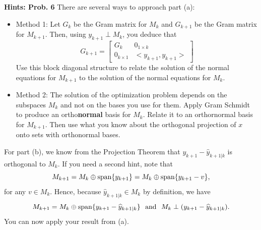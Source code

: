 \documentclass[letterpaper]{article}
\begin{document}
\vspace{1cm}


\noindent \textbf{Hints: Prob. 6 } There are several ways to approach part (a):
\begin{itemize}
\item Method 1: Let $G_k$ be the Gram matrix for $M_k$ and $G_{k+1}$ be the Gram matrix for $M_{k+1}$. Then, using $y_{k+1} \perp M_k$, you deduce that
    $$G_{k+1} = \left[ \begin{array}{cc} G_k & 0_{1 \times k} \\ 0_{k \times 1} & <y_{k+1}, y_{k+1}> \end{array} \right] $$
    Use this block diagonal structure to relate the solution of the normal equations for $M_{k+1}$ to the solution of the normal equations for $M_{k}$.

\item Method 2: The solution of the optimization problem depends on the subspaces $M_k$ and not on the bases you use for them.  Apply Gram Schmidt to produce an ortho\textbf{normal} basis for $M_k$. Relate it to an orthornormal basis for $M_{k+1}$. Then use what you know about the orthogonal projection of $x$ onto sets with orthonormal bases.

\end{itemize}

For part (b), we know from the Projection Theorem that $y_{k+1} - \widehat{y}_{k+1|k}$ is orthogonal to $M_k$. If you need a second hint, note that
$$M_{k+1} = M_k \oplus \textrm{span} \{  y_{k+1}  \}  =  M_k \oplus \textrm{span} \{  y_{k+1} - v  \},$$
for any $v\in M_k$. Hence, because $\widehat{y}_{k+1|k} \in M_k$ by definition, we have
$$M_{k+1} = M_k \oplus \textrm{span} \{  y_{k+1} - \widehat{y}_{k+1|k}  \}~~\mbox{and}~~ M_k \perp (y_{k+1} - \widehat{y}_{k+1|k}).$$
You can now apply your result from (a).

\newpage
\end{document}

